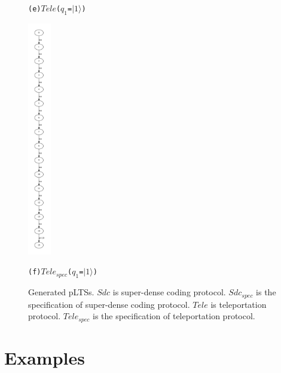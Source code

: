 \documentclass[a4paper,UKenglish,cleveref, autoref]{lipics-v2019}
\begin{document}
\begin{figure} [htbp]
\begin{minipage}{0.2\linewidth}
  \centerline{\texttt{(e)$Tele$($q_1$=$|1\rangle$)}}
\end{minipage}
\hfill
\begin{minipage}{0.1\linewidth}
  \centerline{\includegraphics[width=1.0cm]{images/Tele-spec.pdf}}
  \centerline{\texttt{(f)$Tele_{spec}$($q_1$=$|1\rangle$)}}
\end{minipage}
\caption{Generated pLTSs. $Sdc$ is super-dense coding protocol. $Sdc_{spec}$ is the specification of super-dense coding protocol. $Tele$ is teleportation protocol. $Tele_{spec}$ is the specification of teleportation protocol.}
\label{fig:sdc+tele}
\end{figure}

\section{Examples}
\label{sec:examples}
\end{document}
